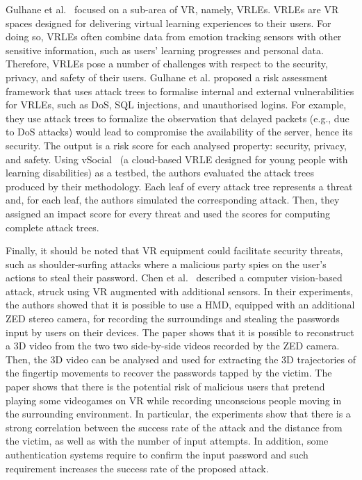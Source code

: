 \documentclass[journal]{IEEEtran}
\begin{document}
Gulhane et al.~\cite{gulhane2019} focused on a sub-area of VR, namely, VRLEs. VRLEs are VR spaces designed for delivering virtual learning experiences to their users. For doing so, VRLEs often combine data from emotion tracking sensors with other sensitive information, such as users' learning progresses and personal data. Therefore, VRLEs pose a number of challenges with respect to the security, privacy, and safety of their users. Gulhane et al. proposed a risk assessment framework that uses attack trees to formalise internal and external vulnerabilities for VRLEs, such as DoS, SQL injections, and unauthorised logins. %
For example, they use attack trees to formalize the observation that delayed packets (e.g., due to DoS attacks) would lead to compromise the availability of the server, hence its security. The output is a risk score for each analysed property: security, privacy, and safety. Using vSocial~\cite{nuguri2021} (a cloud-based VRLE designed for young people with learning disabilities) as a testbed, the authors evaluated the attack trees produced by their methodology. Each leaf of every attack tree represents a threat and, for each leaf, the authors simulated the corresponding attack. Then, they assigned an impact score for every threat and used the scores for computing complete attack trees.

Finally, it should be noted that VR equipment could facilitate security threats, such as shoulder-surfing attacks where a malicious party spies on the user's actions to steal their password. Chen et al.~\cite{chen2018} described a computer vision-based attack, struck using VR augmented with additional sensors. In their experiments, the authors showed that it is possible to use a HMD, equipped with an additional ZED stereo camera, for recording the surroundings and stealing the passwords input by users on their devices. The paper shows that it is possible to reconstruct a 3D video from the two two side-by-side videos recorded by the ZED camera. Then, the 3D video can be analysed and used for extracting the 3D trajectories of the fingertip movements to recover the passwords tapped by the victim. The paper shows that there is the potential risk of malicious users that pretend playing some videogames on VR while recording unconscious people moving in the surrounding environment. In particular, the experiments show that there is a strong correlation between the success rate of the attack and the distance from the victim, as well as with the number of input attempts. In addition, some authentication systems require to confirm the input password and such requirement increases the success rate of the proposed attack. 
\end{document}
